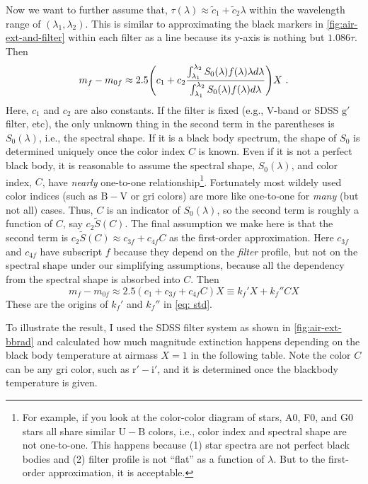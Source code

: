 Now we want to further assume that, $ \tau(\lambda) \approx \tilde{c}_1 + \tilde{c}_2 \lambda $ within the wavelength range of $ (\lambda_1, \lambda_2) $. This is similar to approximating the black markers in \cref{fig:air-ext-and-filter} within each filter as a line because its y-axis is nothing but $ 1.086 \tau $. Then
\begin{equation}
  m_f - m_{0f} 
    \approx 2.5 
    \qty (c_1 + c_2\frac{\int_{\lambda_1}^{\lambda_2} S_0(\lambda) f(\lambda) \lambda d\lambda}
      {\int_{\lambda_1}^{\lambda_2} S_0(\lambda) f(\lambda) d\lambda} ) X ~.
\end{equation}
Here, $ c_1 $ and $ c_2 $ are also constants. If the filter is fixed (e.g., V-band or SDSS $ \mathrm{g'} $ filter, etc), the only unknown thing in the second term in the parentheses is $ S_0(\lambda) $, i.e., the spectral shape. If it is a black body spectrum, the shape of $ S_0 $ is determined uniquely once the color index $ C $ is known. Even if it is not a perfect black body, it is reasonable to assume the spectral shape, $ S_0(\lambda) $, and color index, $ C $, have \textit{nearly} one-to-one relationship\footnote{For example, if you look at the color-color diagram of stars, A0, F0, and G0 stars all share similar $ \mathrm{U} - \mathrm{B} $ colors, i.e., color index and spectral shape are not one-to-one. This happens because (1) star spectra are not perfect black bodies and (2) filter profile is not ``flat'' as a function of $ \lambda $. But to the first-order approximation, it is acceptable.}. Fortunately most wildely used color indices (such as $ \mathrm{B}-\mathrm{V} $ or gri colors) are more like one-to-one for \emph{many} (but not all) cases. Thus, $ C $ is an indicator of $ S_0(\lambda) $, so the second term is roughly a function of $ C $, say $ c_2 \tilde{S}(C) $. The final assumption we make here is that the second term is $ c_2 \tilde{S} (C) \approx c_{3f} + c_{4f} C $ as the first-order approximation. Here $ c_{3f} $ and $ c_{4f} $ have subscript $ f $ because they depend on the \textit{filter} profile, but not on the spectral shape under our simplifying assumptions, because all the dependency from the spectral shape is absorbed into $ C $. Then
\begin{equation}\label{key}
  m_f - m_{0f} 
  \approx 2.5 (c_1 + c_{3f} + c_{4f} C) X 
  \equiv k_f' X + k_f'' CX
\end{equation}
 These are the origins of $ k_f' $ and $ k_f'' $ in \cref{eq: std}.

To illustrate the result, I used the SDSS filter system as shown in \cref{fig:air-ext-bbrad} and calculated how much magnitude extinction happens depending on the black body temperature
at airmass $ X = 1 $ in the following table. Note the color $ C $ can be any gri color, such as $ \mathrm{r}'-\mathrm{i}' $, and it is determined once the blackbody temperature is given.

